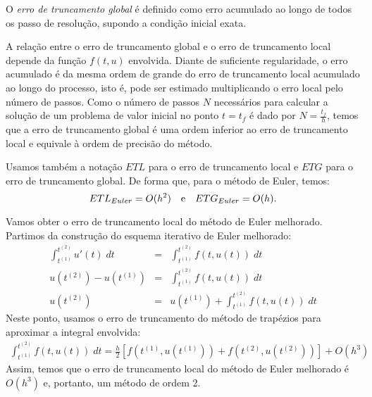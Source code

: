 \begin{defn} O \emph{erro de truncamento global} é definido como erro acumulado ao longo de todos os passo de resolução, supondo a condição inicial exata.
\end{defn}

A relação entre o erro de truncamento global e o erro de truncamento local depende da função $f(t,u)$ envolvida. Diante de suficiente regularidade, o erro acumulado é da mesma ordem de grande do erro de truncamento local acumulado ao longo do processo, isto é, pode ser estimado multiplicando o erro local pelo número de passos. Como o número de passos $N$ necessários para calcular a solução de um problema de valor inicial no ponto $t=t_{f}$ é dado por $N=\frac{t_f}{h}$, temos que a erro de truncamento global é uma ordem inferior ao erro de truncamento local e equivale à ordem de precisão do método.

Usamos também a notação $ETL$ para o erro de truncamento local e $ETG$ para o erro de truncamento global. De forma que, para o método de Euler, temos:
$$ETL_{Euler} = O(h^2) ~~~ \hbox{e} ~~~ ETG_{Euler}=O(h).$$
\begin{ex} Vamos obter o erro de truncamento local do método de Euler melhorado.
Partimos da construção do esquema iterativo de Euler melhorado:
\begin{eqnarray}
  \int_{t^{(1)}}^{t^{(2)}} u'(t) \;dt &=& \int_{t^{(1)}}^{t^{(2)}} f(t,u(t)) \; dt\\
  u(t^{(2)})-u(t^{(1)})               &=& \int_{t^{(1)}}^{t^{(2)}} f(t,u(t)) \; dt\\
  u(t^{(2)})                      &=& u(t^{(1)}) +  \int _{t^{(1)}}^{t^{(2)}} f(t,u(t)) \; dt
\end{eqnarray}
Neste ponto, usamos o erro de truncamento do método de trapézios para aproximar a integral envolvida:
\begin{eqnarray*}
\int _{t^{(1)}}^{t^{(2)}} f(t,u(t)) \; dt = \frac{h}{2}\left[f\left(t^{(1)},u(t^{(1)})\right) + f\left(t^{(2)},u(t^{(2)})\right)\right] + O(h^3)
\end{eqnarray*}
Assim, temos que o erro de truncamento local do método de Euler melhorado é $O(h^3)$ e, portanto, um método de ordem 2.
\end{ex}

